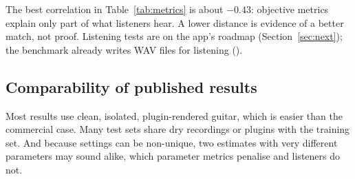 \begin{caution}
The best correlation in Table~\ref{tab:metrics} is about $-0.43$: objective
metrics explain only part of what listeners hear. A lower distance is evidence
of a better match, not proof. Listening tests are on the app's roadmap
(Section~\ref{sec:next}); the benchmark already writes WAV files for listening
().
\end{caution}

\subsection{Comparability of published results}

Most results use clean, isolated, plugin-rendered guitar, which is easier than
the commercial case. Many test sets share dry recordings or plugins with the
training set. And because settings can be non-unique, two estimates with very
different parameters may sound alike, which parameter metrics penalise and
listeners do not.
